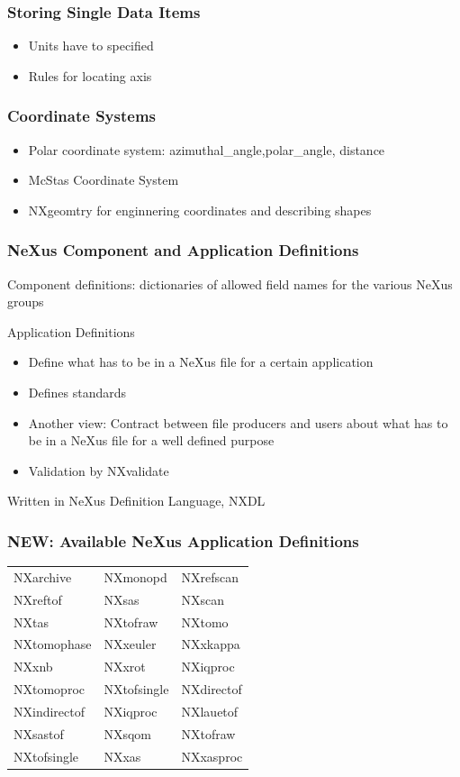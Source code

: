 \documentclass{beamer}
\newcommand{\changefont}[3] {
 \fontfamily{#1} \fontseries{#2} \fontshape{#3} \selectfont}
\begin{document}
\begin{frame} \frametitle{Storing Single Data Items }
\begin{itemize}
\item Units have to specified
\item Rules for locating axis
\end{itemize}
\end{frame}

\begin{frame} \frametitle{Coordinate Systems}
\begin{itemize}
\item Polar coordinate system: azimuthal\_angle,polar\_angle, distance
\item McStas Coordinate System
\item NXgeomtry for enginnering coordinates and describing shapes
\end{itemize}
\end{frame}



\begin{frame} \frametitle{NeXus Component and Application Definitions }
\begin{itemize}
\item Component definitions: 
 dictionaries of allowed field names for the various NeXus groups
{\changefont{cmr}{bx}{sc} 
\item Application Definitions
\begin{itemize}
\item Define what has to be in a NeXus file for a certain application
\item Defines standards
\item Another view: Contract between file producers and users about what has to be in 
 a NeXus file for a well defined purpose 
\item Validation by NXvalidate
\end{itemize}
}
\item Written in NeXus Definition Language, NXDL
\end{itemize}
\end{frame}


\begin{frame} \frametitle{{\color{red}NEW}: Available NeXus Application Definitions}
{\changefont{cmr}{bx}{sc} 
\begin{tabular}{lll}
NXarchive& NXmonopd & NXrefscan \\
NXreftof & NXsas & NXscan \\
NXtas & NXtofraw& NXtomo\\
NXtomophase & NXxeuler & NXxkappa\\
NXxnb & NXxrot & NXiqproc \\
NXtomoproc & NXtofsingle& NXdirectof\\
NXindirectof & NXiqproc& NXlauetof\\
NXsastof& NXsqom& NXtofraw\\
NXtofsingle& NXxas& NXxasproc\\
\end{tabular}
}
\end{frame}
\end{document}
